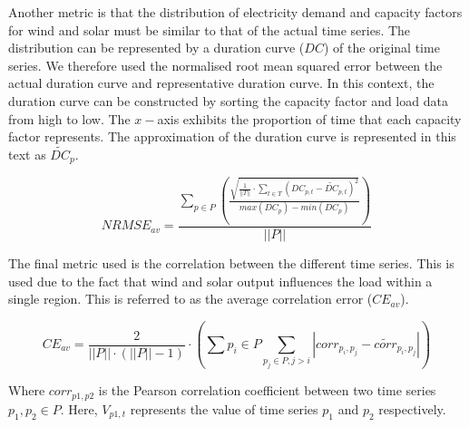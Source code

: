 \documentclass[final,3p,times,twocolumn,numbers]{elsarticle}
\begin{document}
Another metric is that the distribution of electricity demand and capacity factors for wind and solar must be similar to that of the actual time series. The distribution can be represented by a duration curve ($DC$) of the original time series. We therefore used the normalised root mean squared error between the actual duration curve and representative duration curve. In this context, the duration curve can be constructed by sorting the capacity factor and load data from high to low. The $x-$axis exhibits the proportion of time that each capacity factor represents. The approximation of the duration curve is represented in this text as $\widetilde{DC}_p$.



\begin{equation}
	NRMSE_{av}=\frac
	{\sum\limits_{p\in P}\left(\frac
	{\sqrt{
	\frac{1}{\left|\left|T\right|\right|}
	\cdot
	\sum\limits_{t\in T}(DC_{p,t}-\widetilde{DC}_{p,t})^2}
	}
	{max(DC_p)-min(DC_p)}
	\right)}
	{\left|\left|P\right|\right|}
\end{equation}


The final metric used is the correlation between the different time series. This is used due to the fact that wind and solar output influences the load within a single region. This is referred to as the average correlation error ($CE_{av}$).

\begin{equation}
	CE_{av}=\frac{2}{\left|\left|P\right|\right|\cdot(\left|\left|P\right|\right|-1)}\cdot
	\left(
	\sum\limits{p_i\in P}\sum\limits_{p_j\in P,j>i}
	\left|
	corr_{p_i,p_j}-\widetilde{corr}_{p_i,p_j}
	\right|
	\right)
\end{equation}

Where $corr_{p1,p2}$ is the Pearson correlation coefficient between two time series $p_1,p_2\in P$. Here, $V_{p1,t}$ represents the value of time series $p_1$ and $p_2$ respectively. 
\end{document}
